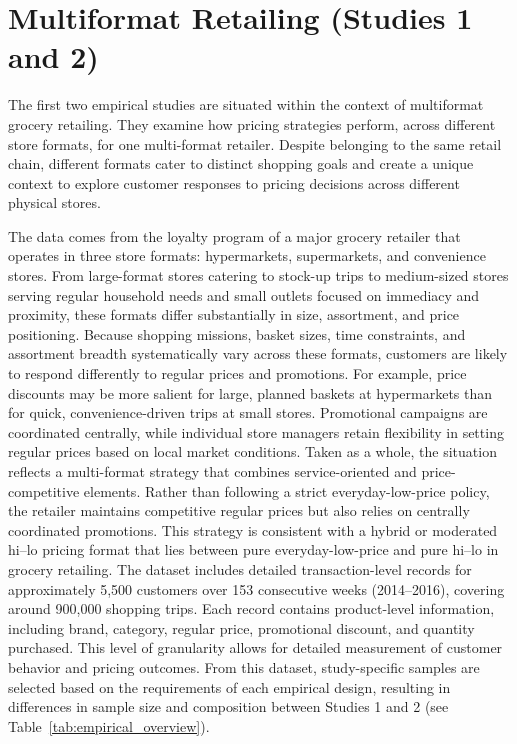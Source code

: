 \section{Multiformat Retailing (Studies 1 and 2)}
The first two empirical studies are situated within the context of multiformat grocery retailing. They examine how pricing strategies perform, across different store formats, for one multi-format retailer. Despite belonging to the same retail chain, different formats cater to distinct shopping goals and create a unique context to explore customer responses to pricing decisions across different physical stores.

The data comes from the loyalty program of a major grocery retailer that operates in three store formats: hypermarkets, supermarkets, and convenience stores. From large-format stores catering to stock-up trips to medium-sized stores serving regular household needs and small outlets focused on immediacy and proximity, these formats differ substantially in size, assortment, and price positioning. Because shopping missions, basket sizes, time constraints, and assortment breadth systematically vary across these formats, customers are likely to respond differently to regular prices and promotions. For example, price discounts may be more salient for large, planned baskets at hypermarkets than for quick, convenience-driven trips at small stores. Promotional campaigns are coordinated centrally, while individual store managers retain flexibility in setting regular prices based on local market conditions. Taken as a whole, the situation reflects a multi-format strategy that combines service-oriented and price-competitive elements. Rather than following a strict everyday-low-price policy, the retailer maintains competitive regular prices but also relies on centrally coordinated promotions. This strategy is consistent with a hybrid or moderated hi–lo pricing format that lies between pure everyday-low-price and pure hi–lo in grocery retailing. The dataset includes detailed transaction-level records for approximately 5,500 customers over 153 consecutive weeks (2014–2016), covering around 900,000 shopping trips. Each record contains product-level information, including brand, category, regular price, promotional discount, and quantity purchased. This level of granularity allows for detailed measurement of customer behavior and pricing outcomes. From this dataset, study-specific samples are selected based on the requirements of each empirical design, resulting in differences in sample size and composition between Studies 1 and 2 (see Table~\ref{tab:empirical_overview}).


